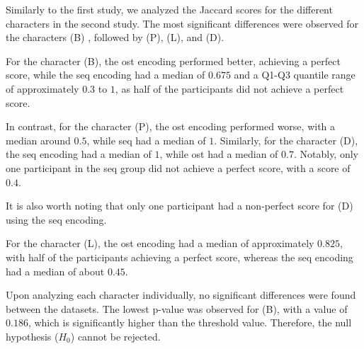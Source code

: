 Similarly to the first study, we analyzed the Jaccard scores for the different characters in the second study. The most significant differences were observed for the characters (B) , followed by (P), (L), and (D).

For the character (B), the \gls{ost} encoding performed better, achieving a perfect score, while the \gls{seq} encoding had a median of $0.675$ and a Q1-Q3 quantile range of approximately $0.3$ to $1$, as half of the participants did not achieve a perfect score.

In contrast, for the character (P), the \gls{ost} encoding performed worse, with a median around $0.5$, while \gls{seq} had a median of $1$. Similarly, for the character (D), the \gls{seq} encoding had a median of $1$, while \gls{ost} had a median of $0.7$. Notably, only one participant in the \gls{seq} group did not achieve a perfect score, with a score of $0.4$.

It is also worth noting that only one participant had a non-perfect score for (D) using the \gls{seq} encoding.

For the character (L), the \gls{ost} encoding had a median of approximately $0.825$, with half of the participants achieving a perfect score, whereas the \gls{seq} encoding had a median of about $0.45$.

Upon analyzing each character individually, no significant differences were found between the datasets. The lowest p-value was observed for (B), with a value of $0.186$, which is significantly higher than the threshold value. Therefore, the null hypothesis ($H_0$) cannot be rejected.




